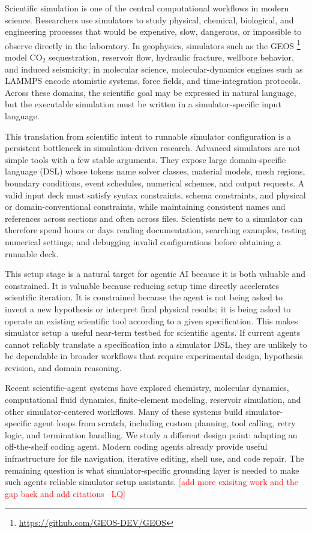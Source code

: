 \documentclass{article}
\newcommand{\lianhui}[1]{\textcolor{red}{[#1 --LQ]}}
\begin{document}
Scientific simulation is one of the central computational workflows in modern science. Researchers use simulators to study physical, chemical, biological, and engineering processes that would be expensive, slow, dangerous, or impossible to observe directly in the laboratory. In geophysics, simulators such as the GEOS \footnote{\url{https://github.com/GEOS-DEV/GEOS}}~\citep{geos2024} model CO$_2$ sequestration, reservoir flow, hydraulic fracture, wellbore behavior, and induced seismicity; in molecular science, molecular-dynamics engines such as LAMMPS \citep{holbrook2026lammps} encode atomistic systems, force fields, and time-integration protocols. Across these domains, the scientific goal may be expressed in natural language, but the executable simulation must be written in a simulator-specific input language.

This translation from scientific intent to runnable simulator configuration is a persistent bottleneck in simulation-driven research. Advanced simulators are not simple tools with a few stable arguments. They expose large domain-specific language (DSL) whose tokens name solver classes, material models, mesh regions, boundary conditions, event schedules, numerical schemes, and output requests. A valid input deck must satisfy syntax constraints, schema constraints, and physical or domain-conventional constraints, while maintaining consistent names and references across sections and often across files. Scientists new to a simulator can therefore spend hours or days reading documentation, searching examples, testing numerical settings, and debugging invalid configurations before obtaining a runnable deck.

This setup stage is a natural target for agentic AI because it is both valuable and constrained. It is valuable because reducing setup time directly accelerates scientific iteration. It is constrained because the agent is not being asked to invent a new hypothesis or interpret final physical results; it is being asked to operate an existing scientific tool according to a given specification. This makes simulator setup a useful near-term testbed for scientific agents. If current agents cannot reliably translate a specification into a simulator DSL, they are unlikely to be dependable in broader workflows that require experimental design, hypothesis revision, and domain reasoning.

Recent scientific-agent systems have explored chemistry, molecular dynamics, computational fluid dynamics, finite-element modeling, reservoir simulation, and other simulator-centered workflows. Many of these systems build simulator-specific agent loops from scratch, including custom planning, tool calling, retry logic, and termination handling. We study a different design point: adapting an off-the-shelf coding agent. Modern coding agents already provide useful infrastructure for file navigation, iterative editing, shell use, and code repair. The remaining question is what simulator-specific grounding layer is needed to make such agents reliable simulator setup assistants. \lianhui{add more exisitng work and the gap back and add citations}
\end{document}
